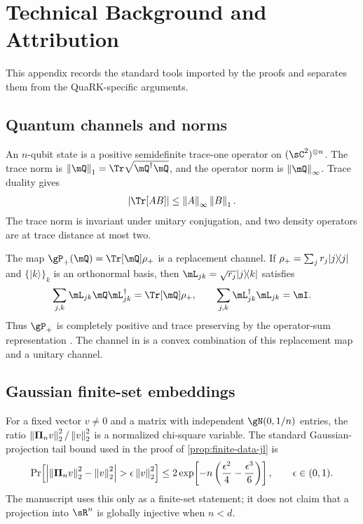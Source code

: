 \section{Technical Background and Attribution}
\label{app:technical-background}

This appendix records the standard tools imported by the proofs and separates
them from the QuaRK-specific arguments.

\subsection{Quantum channels and norms}

An $n$-qubit state is a positive semidefinite trace-one operator on
$(\sC^2)^{\otimes n}$. The trace norm is
$\traceNorm{\mQ}=\Tr\sqrt{\mQ^\dagger\mQ}$, and the operator norm is
$\opNorm{\mQ}$. Trace duality gives
\begin{equation}
    \abs{\Tr[AB]}\leq\opNorm{A}\traceNorm{B}.
    \label{eq:trace-duality-background}
\end{equation}
The trace norm is invariant under unitary conjugation, and two density
operators are at trace distance at most two.

The map $\replacementChannel(\mQ)=\Tr[\mQ]\rhoreset$ is a replacement
channel. If $\rho_{+}=\sum_j r_j\lvert j\rangle\!\langle j\rvert$ and
$\{\lvert k\rangle\}_k$ is an orthonormal basis, then
$\Kraus_{jk}=\sqrt{r_j}\lvert j\rangle\!\langle k\rvert$ satisfies
\[
    \sum_{j,k}\Kraus_{jk}\mQ\Kraus_{jk}^\dagger=\Tr[\mQ]\rhoreset,
    \qquad
    \sum_{j,k}\Kraus_{jk}^\dagger\Kraus_{jk}=\identity.
\]
Thus $\replacementChannel$ is completely positive and trace preserving by
the operator-sum representation \citep{Kraus1971}. The channel in
 is a convex combination of this replacement map
and a unitary channel.

\subsection{Gaussian finite-set embeddings}

For a fixed vector $v\neq0$ and a matrix with independent $\gN(0,1/n)$
entries, the ratio $\left\lVert\bm{\Pi}_nv\right\rVert_2^2/\left\lVert v\right\rVert_2^2$ is a normalized
chi-square variable. The standard Gaussian-projection tail bound used in the
proof of \cref{prop:finite-data-jl} is
\[
\Pr\!\left[
  \left|\left\lVert\bm{\Pi}_nv\right\rVert_2^2-\left\lVert v\right\rVert_2^2\right|
  >\epsilon\left\lVert v\right\rVert_2^2
\right]
\leq
2\exp\!\left[-n\left(\frac{\epsilon^2}{4}-\frac{\epsilon^3}{6}\right)\right],
\qquad \epsilon\in(0,1).
\]
The manuscript uses this only as a finite-set statement; it does not claim
that a projection into $\sR^n$ is globally injective when $n<d$.

